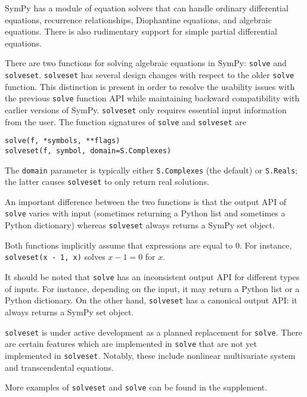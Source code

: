 SymPy has a module of equation solvers that can handle ordinary differential
equations, recurrence relationships, Diophantine equations, and algebraic
equations. There is also
rudimentary support for simple partial differential equations.

There are two functions for solving algebraic equations in SymPy:
\texttt{solve} and \texttt{solveset}.
\texttt{solveset} has several design changes with respect to the older
\texttt{solve} function. This distinction is present in order to resolve the
usability issues with the
previous \texttt{solve} function API while maintaining backward compatibility
with earlier versions of SymPy.
\texttt{solveset} only requires essential input information from the user.
The function signatures of \texttt{solve} and \texttt{solveset} are
\begin{verbatim}
solve(f, *symbols, **flags)
solveset(f, symbol, domain=S.Complexes)
\end{verbatim}
The \texttt{domain} parameter is typically either \texttt{S.Complexes} (the
default) or \texttt{S.Reals}; the latter causes \texttt{solveset} to only return real solutions.

An important difference between the two functions is that the output API of \texttt{solve}
varies with input (sometimes returning a Python list and sometimes a Python dictionary) whereas
\texttt{solveset} always returns
a SymPy set object.

Both functions implicitly assume that expressions are equal to 0. For
instance, \texttt{solveset(x - 1, x)} solves $x - 1 = 0$ for $x$.

It should be noted that \texttt{solve} has an inconsistent output API for different types
of inputs. For instance, depending on the input, it may return a Python
list or a Python dictionary. On the other hand,
\texttt{solveset} has a canonical output API: it always returns
a SymPy set object.

\texttt{solveset} is under active development as a planned replacement for
\texttt{solve}. There are certain features which are implemented in
\texttt{solve} that are not yet implemented in \texttt{solveset}. Notably,
these include nonlinear multivariate system and transcendental equations.

More examples of \texttt{solveset} and \texttt{solve} can be found in the
supplement.
